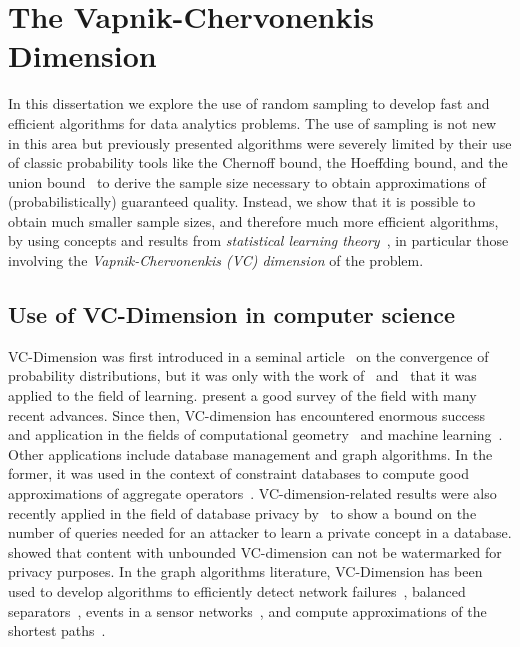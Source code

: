 \chapter{The Vapnik-Chervonenkis Dimension}\label{ch:vcdim}
In this dissertation we explore the use of random sampling to develop fast and
efficient algorithms for data analytics problems. The use of sampling is not new
in this area but previously presented algorithms were severely limited by their
use of classic probability tools like the Chernoff bound, the Hoeffding bound,
and the union bound~\citep{MitzenmacherU05} to derive the sample size
necessary to obtain approximations of (probabilistically) guaranteed quality.
Instead, we show that it is possible to obtain much smaller sample sizes, and
therefore much more efficient algorithms, by using concepts and results from
\emph{statistical learning theory}~\citep{Vapnik99,Vapnik98}, in particular
those involving the \emph{Vapnik-Chervonenkis (VC) dimension} of the problem.

\section{Use of VC-Dimension in computer science}\label{sec:vcliterature}
VC-Dimension was first introduced in a seminal article~\citep{VapnikC71} on
the convergence of probability distributions, but it was only with the work
of~\citet{HausslerW86} and~\citet{BlumerEHW89} that it was applied to the field
of learning. \citet{BoucheronBL05} present a good survey of the field with many
recent advances. Since then, VC-dimension has encountered enormous success and
application in the fields of computational
geometry~\citep{Chazelle00,Matousek02} and machine
learning~\citep{AnthonyB99,DevroyeGL96}. Other applications include database
management and graph algorithms.  In the former, it was used in the context of
constraint databases to compute good approximations of aggregate
operators~\citep{BenediktL02}.  VC-dimension-related results were also recently
applied in the field of database privacy by~\citet{BlumLR08} to show a bound on
the number of queries needed for an attacker to learn a private concept in a
database. \citet{Gross11} showed that content with unbounded VC-dimension can
not be watermarked for privacy purposes. In the graph algorithms literature,
VC-Dimension has been used to develop algorithms to efficiently detect network
failures~\citep{Kleinberg03,KleinbergSS08}, balanced
separators~\citep{FeigeM06}, events in a sensor networks~\citep{GandhiSW10}, and
compute approximations of the shortest paths~\citep{AbrahamDFGW11}.

